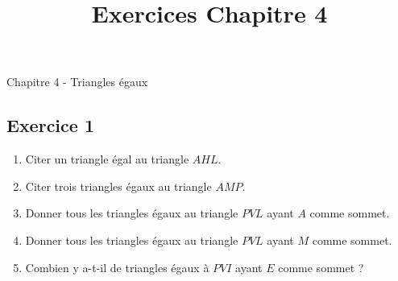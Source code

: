 \documentclass[12 pt]{extarticle}
\title{Exercices Chapitre 4}
\date{}
\theoremstyle{plain}
\newcounter{AlphNode}
\renewcommand*{\theAlphNode}{\Alph{AlphNode}}
\begin{document}
\begin{center}{\Large Chapitre 4 - Triangles égaux}\\
 \end{center} 
 
 \subsection*{Exercice 1}
 \begin{figure}[H]
 \center
 \end{figure}
  
  \begin{enumerate}
  \item Citer un triangle égal au triangle $AHL$. 
  \item Citer trois triangles égaux au triangle $AMP$. 
  \item Donner tous les triangles égaux au triangle $PVL$ ayant $A$ comme sommet.
   \item Donner tous les triangles égaux au triangle $PVL$ ayant $M$ comme sommet.
  \item Combien y a-t-il de triangles égaux à $PVI$ ayant $E$ comme sommet ? 
  \end{enumerate}
 
 	
\end{document}
